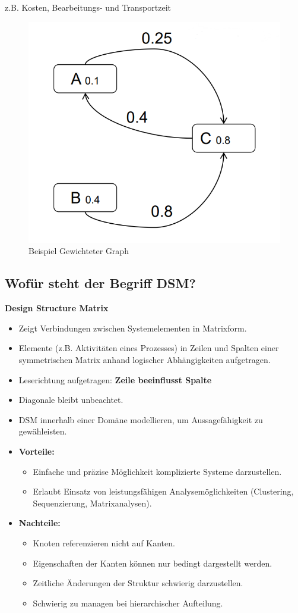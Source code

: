 z.B. Kosten, Bearbeitungs- und Transportzeit

\begin{figure}[H]
    \centering
    \includegraphics[width=0.6\linewidth]{Bilder/Teil3_GewichteterGraph.png}
    \caption{Beispiel Gewichteter Graph}
\end{figure}


\subsection{Wofür steht der Begriff DSM?}
\textbf{Design Structure Matrix}
\begin{itemize}
    \item Zeigt Verbindungen zwischen Systemelementen in Matrixform.
    \item Elemente (z.B. Aktivitäten eines Prozesses) in Zeilen und Spalten einer symmetrischen Matrix anhand logischer Abhängigkeiten aufgetragen. 
    \item Leserichtung aufgetragen: \textbf{Zeile beeinflusst Spalte}
    \item Diagonale bleibt unbeachtet.
    \item DSM innerhalb einer Domäne modellieren, um Aussagefähigkeit zu gewähleisten.
    \item \textbf{Vorteile:}
        \begin{itemize}
            \item Einfache und präzise Möglichkeit komplizierte Systeme darzustellen.
            \item Erlaubt Einsatz von leistungsfähigen Analysemöglichkeiten (Clustering, Sequenzierung, Matrixanalysen).
        \end{itemize}
    \item \textbf{Nachteile:}
        \begin{itemize}
            \item Knoten referenzieren nicht auf Kanten.
            \item Eigenschaften der Kanten können nur bedingt dargestellt werden.
            \item Zeitliche Änderungen der Struktur schwierig darzustellen.
            \item Schwierig zu managen bei hierarchischer Aufteilung.
        \end{itemize}
\end{itemize}

